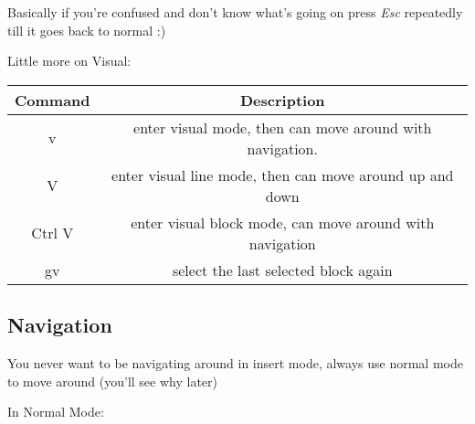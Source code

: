 \documentclass[12pt, letterpaper]{article}
\begin{document}
Basically if you're confused and don't know what's going on press \textit{Esc}
repeatedly till it goes back to normal :)


Little more on Visual:

\begin{table}[H]
    \begin{tabular}{|c|c|}
        Command & Description \\
        \hline
        v & enter visual mode, then can move around with navigation. \\
        V & enter visual line mode, then can move around up and down \\
        Ctrl V& enter visual block mode, can move around with navigation \\
        gv & select the last selected block again \\
    \end{tabular}
\end{table}



\subsection{Navigation}
You never want to be navigating around in insert mode, always use normal mode
to move around (you'll see why later)

In Normal Mode:
\end{document}
